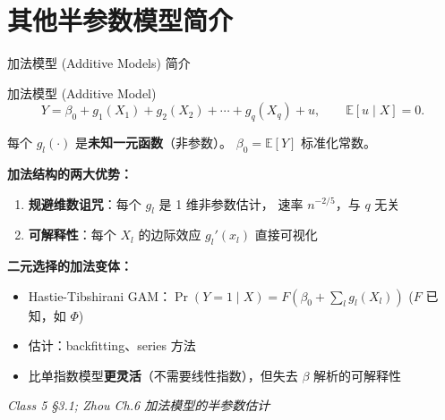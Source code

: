 \documentclass[aspectratio=169, 10pt]{beamer}
\begin{document}
\section{其他半参数模型简介}

\begin{frame}{加法模型 (Additive Models) 简介}

  \begin{definitionbox}{{加法模型 (Additive Model)}}
    $$Y = \beta_0 + g_1(X_1) + g_2(X_2) + \cdots + g_q(X_q) + u, \qquad \mathbb{E}[u\mid X] = 0.$$

    每个 $g_l(\cdot)$ 是\textbf{未知一元函数}（非参数）。
    $\beta_0 = \mathbb{E}[Y]$ 标准化常数。
  \end{definitionbox}

  \begin{highlightbox}
    \textbf{加法结构的两大优势：}
    \begin{enumerate}\setlength{\itemsep}{1pt}
      \item \textbf{规避维数诅咒}：每个 $g_l$ 是 1 维非参数估计，
      速率 $n^{-2/5}$，与 $q$ 无关
      \item \textbf{可解释性}：每个 $X_l$ 的边际效应 $g_l'(x_l)$ 直接可视化
    \end{enumerate}
  \end{highlightbox}

  \begin{keybox}
    \textbf{二元选择的加法变体：}
    \begin{itemize}\setlength{\itemsep}{1pt}
      \item Hastie-Tibshirani GAM：$\Pr(Y=1\mid X) = F(\beta_0 + \sum_l g_l(X_l))$
      ($F$ 已知，如 $\Phi$)
      \item 估计：backfitting、series 方法
      \item 比单指数模型\textbf{更灵活}（不需要线性指数），但失去 $\beta$ 解析的可解释性
    \end{itemize}
  \end{keybox}

  \hfill{\scriptsize\textit{Class 5 §3.1; Zhou Ch.6 加法模型的半参数估计}}

\end{frame}
\end{document}
